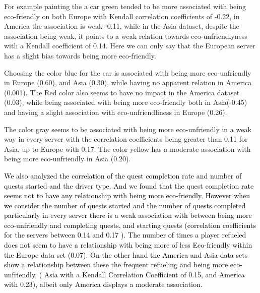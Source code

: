 \documentclass[preprint,authoryear,12pt]{elsarticle}
\begin{document}
For example painting the a car green tended to be more associated with being eco-friendly on both Europe with Kendall correlation coefficients of -0.22, in America the association is weak -0.11, while in the Asia dataset, despite the association being weak, it points to a weak relation towards eco-unfriendlyness with a Kendall coefficient of 0.14. Here we can only say that the European server has a slight bias towards being more eco-friendly.

Choosing the color blue for the car is associated with being more eco-unfriendly in Europe (0.60), and Asia (0.30), while having no apparent relation in America (0.001).
The Red color also seems to have no impact in the America dataset (0.03), while being associated with being more eco-friendly both in Asia(-0.45) and having a slight association with eco-unfriendliness in Europe (0.26).

The color gray seems to be associated with being more eco-unfriendly in a weak way in every server with the correlation coefficients being greater than 0.11 for Asia, up to Europe with 0.17. The color yellow has a moderate association with being more eco-unfriendly in Asia (0.20).

%



\textcolor{black}{
We also analyzed the correlation of the quest completion rate and number of quests started and the driver type. And we found that the quest completion rate seems not to have any relationship with being more eco-friendly. 
However when we consider the number of quests started and the number of quests completed 
particularly in every server there is a weak association with between being more eco-unfriendly and completing quests, and starting quests (correlation coefficients for the servers between 0.14 and 0.17 ). 
}
\textcolor{black}{
The number of times a player refueled does not seem to have a relationship with being more of less Eco-friendly within the Europe data set (0.07). On the other hand the America and Asia data sets show a relationship between these the frequent refueling and being more eco-unfriendly, ( Asia with a Kendall Correlation Coefficient of 0.15, and America with 0.23), albeit only America displays a moderate association.
}
\end{document}
